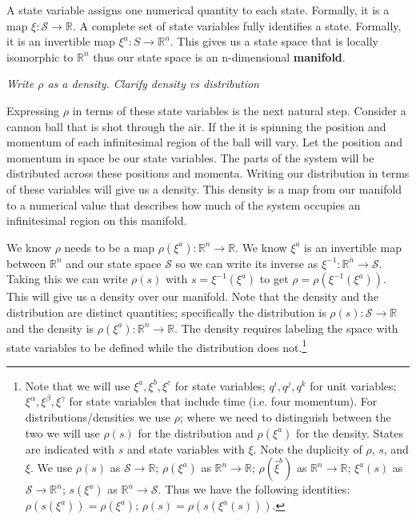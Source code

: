 \documentclass{article}
\begin{document}
\begin{defn}
	A state variable assigns one numerical quantity to each state. Formally, it is a map $\xi : \mathcal{S} \to \mathbb{R}$. A complete set of state variables fully identifies a state. Formally, it is an invertible  map $\xi^a : S \rightarrow \mathbb{R}^n $. This gives us a state space that is locally isomorphic to $\mathbb{R}^n$ thus our state space is an n-dimensional \textbf{manifold}.
\end{defn}

	\emph{Write $\rho$ as a density. Clarify density vs distribution} 
		
	Expressing $\rho$ in terms of these state variables is the next natural step. Consider a cannon ball that is shot through the air. If the it is spinning the position and momentum of each infinitesimal region of the ball will vary. Let the position and momentum in space be our state variables. The parts of the system will be distributed across these positions and momenta. Writing our distribution in terms of these variables will give us a density. This density is a map from our manifold to a numerical value that describes how much of the system occupies an infinitesimal region on this manifold.
	
	We know $\rho$ needs to be a map $\rho(\xi^a): \mathbb{R}^n \to \mathbb{R}$. We know $\xi^a$ is an invertible map between $\mathbb{R}^n$ and our state space $\mathcal{S}$ so we can write its inverse as $\xi^{-1} : \mathbb{R}^n \to \mathcal{S}$. Taking this we can write $\rho(s)$ with $s = \xi^{-1}(\xi^a)$ to get $\rho = \rho(\xi^{-1}(\xi^a))$. This will give us a density over our manifold. Note that the density and the distribution are distinct quantities; specifically the distribution is $\rho(s) : \mathcal{S} \to \mathbb{R}$ and the density is $\rho(\xi^a) : \mathbb{R}^n \to \mathbb{R}$. The density requires labeling the space with state variables to be defined while the distribution does not.\footnote{Note that we will use $\xi^a, \xi^b, \xi^c$ for state variables; $q^i, q^j, q^k$ for unit variables; $\xi^\alpha, \xi^\beta, \xi^\gamma$ for state variables that include time (i.e. four momentum). For distributions/densities we use $\rho$; where we need to distinguish between the two we will use $\rho(s)$ for the distribution and $\rho(\xi^a)$ for the density. States are indicated with $s$ and state variables with $\xi$. Note the duplicity of $\rho$, $s$, and $\xi$. We use $\rho(s)$ as $\mathcal{S} \to \mathbb{R}$; $\rho(\xi^a)$ as $\mathbb{R}^n \to \mathbb{R}$; $\rho(\hat{\xi}^b)$ as $\mathbb{R}^n \to \mathbb{R}$; $\xi^a(s)$ as $\mathcal{S} \to \mathbb{R}^n$; $s(\xi^a)$ as $\mathbb{R}^n \to \mathcal{S}$.
Thus we have the following identities: $\rho(s(\xi^a)) = \rho(\xi^a)$; $\rho(s) = \rho(s (\xi^a(s)))$.}
\end{document}
